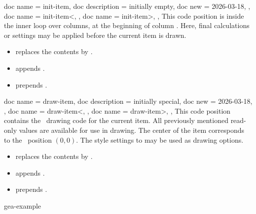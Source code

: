\documentclass[a4paper,11pt]{article}
\begin{document}
\begin{docGeaKeys}
  [
      doc parameter   = {=\marg{code}},
  ]
  {
    {
      doc name        = init-item,
      doc description = {initially empty},
      doc new         = 2026-03-18,
    },
    {
      doc name        = init-item<,
    },
    {
      doc name        = init-item>,
    },
  }
  This code position is inside the inner loop over columns, at the beginning of
  column . Here, final calculations or
  settings may be applied before the current item is drawn.
  \begin{itemize}
  \item {}  replaces the contents by .
  \item {} appends .
  \item {} prepends .
  \end{itemize}
\end{docGeaKeys}


\begin{docKeys}
  [
      doc parameter   = {=\marg{code}},
      doc keypath     = tikz/geomarray,
  ]
  {
    {
      doc name        = draw-item,
      doc description = {initially special},
      doc new         = 2026-03-18,
    },
    {
      doc name        = draw-item<,
    },
    {
      doc name        = draw-item>,
    },
  }
  This code position contains the \tikzname\ drawing code for the current item.
  All previously mentioned read-only values are available for use in drawing. The
  center of the item corresponds to the \tikzname\ position $(0,0)$. The style
  settings
   to
   may be used as drawing options.
  \begin{itemize}
  \item {}  replaces the contents by .
  \item {} appends .
  \item {} prepends .
  \end{itemize}
\end{docKeys}


\begin{dispExample*}{gea-example}
\ExplSyntaxOn
{}
\ExplSyntaxOff
\end{dispExample*}
\end{document}
